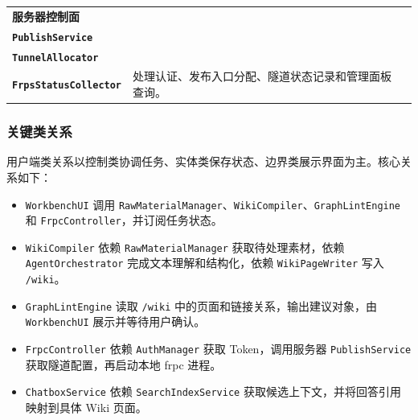 \documentclass[UTF8,a4paper,12pt,fontset=fandol]{ctexart}
\newcommand{\code}[1]{\texttt{\footnotesize #1}}
\begin{document}
\begin{longtable}{>{\bfseries}p{3.4cm}p{4.2cm}p{6.4cm}}
服务器控制面 & \begin{tabular}[t]{@{}l@{}}\code{AuthService}\\\code{PublishService}\\\code{TunnelAllocator}\\\code{FrpsStatusCollector}\end{tabular} & 处理认证、发布入口分配、隧道状态记录和管理面板查询。 \\
\bottomrule
\end{longtable}

\subsubsection{关键类关系}
用户端类关系以控制类协调任务、实体类保存状态、边界类展示界面为主。核心关系如下：
\begin{itemize}
  \item \code{WorkbenchUI} 调用 \code{RawMaterialManager}、\code{WikiCompiler}、\code{GraphLintEngine} 和 \code{FrpcController}，并订阅任务状态。
  \item \code{WikiCompiler} 依赖 \code{RawMaterialManager} 获取待处理素材，依赖 \code{AgentOrchestrator} 完成文本理解和结构化，依赖 \code{WikiPageWriter} 写入 \code{/wiki}。
  \item \code{GraphLintEngine} 读取 \code{/wiki} 中的页面和链接关系，输出建议对象，由 \code{WorkbenchUI} 展示并等待用户确认。
  \item \code{FrpcController} 依赖 \code{AuthManager} 获取 Token，调用服务器 \code{PublishService} 获取隧道配置，再启动本地 frpc 进程。
  \item \code{ChatboxService} 依赖 \code{SearchIndexService} 获取候选上下文，并将回答引用映射到具体 Wiki 页面。
\end{itemize}
\end{document}
